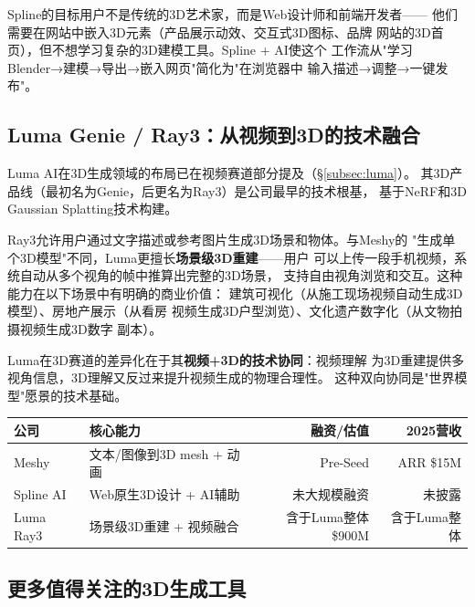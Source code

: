 Spline的目标用户不是传统的3D艺术家，而是Web设计师和前端开发者——
他们需要在网站中嵌入3D元素（产品展示动效、交互式3D图标、品牌
网站的3D首页），但不想学习复杂的3D建模工具。Spline + AI使这个
工作流从"学习Blender→建模→导出→嵌入网页"简化为"在浏览器中
输入描述→调整→一键发布"。

\subsection{Luma Genie / Ray3：从视频到3D的技术融合}
\label{subsec:luma-genie}

Luma AI在3D生成领域的布局已在视频赛道部分提及（\S\ref{subsec:luma}）。
其3D产品线（最初名为Genie，后更名为Ray3）是公司最早的技术根基，
基于NeRF和3D Gaussian Splatting技术构建。

Ray3允许用户通过文字描述或参考图片生成3D场景和物体。与Meshy的
"生成单个3D模型"不同，Luma更擅长\textbf{场景级3D重建}——用户
可以上传一段手机视频，系统自动从多个视角的帧中推算出完整的3D场景，
支持自由视角浏览和交互。这种能力在以下场景中有明确的商业价值：
建筑可视化（从施工现场视频自动生成3D模型）、房地产展示（从看房
视频生成3D户型浏览）、文化遗产数字化（从文物拍摄视频生成3D数字
副本）。

Luma在3D赛道的差异化在于其\textbf{视频+3D的技术协同}：视频理解
为3D重建提供多视角信息，3D理解又反过来提升视频生成的物理合理性。
这种双向协同是"世界模型"愿景的技术基础。

\begin{keybox}
\small
\begin{tabularx}{\textwidth}{l X r r}
\toprule
\rowcolor{figLightGray}
\textbf{公司} & \textbf{核心能力} & \textbf{融资/估值} & \textbf{2025营收} \\
\midrule
Meshy      & 文本/图像到3D mesh + 动画  & Pre-Seed                & ARR \$15M \\
Spline AI  & Web原生3D设计 + AI辅助     & 未大规模融资            & 未披露 \\
Luma Ray3  & 场景级3D重建 + 视频融合    & 含于Luma整体\$900M      & 含于Luma整体 \\
\bottomrule
\end{tabularx}
\end{keybox}

\subsection{更多值得关注的3D生成工具}

